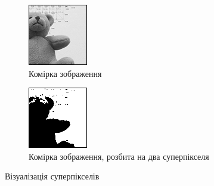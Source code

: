 \begin{figure}[h]
\centering
    \begin{subfigure}[t]{0.4\textwidth}
        \centering
        \includegraphics[width=\textwidth]{images/cell}
        \caption{Комірка зображення}
        \label{fig:cell}
    \end{subfigure}
    \hfill
    \begin{subfigure}[t]{0.4\textwidth}
        \centering
        \includegraphics[width=\textwidth]{images/superpixels}
        \caption{Комірка зображення, розбита на два суперпікселя}
        \label{fig:superpixels}
    \end{subfigure}
    \caption{Візуалізація суперпікселів}
    \label{fig:superpixels:visualization}
\end{figure}

